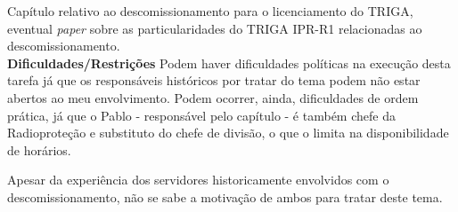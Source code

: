 Capítulo relativo ao descomissionamento para o licenciamento do TRIGA, eventual 
\textit{paper} sobre as particularidades do TRIGA IPR-R1 relacionadas ao descomissionamento.\\

\textbf{Dificuldades/Restrições}
Podem haver dificuldades políticas na execução desta tarefa já que os responsáveis 
históricos por tratar do tema podem não estar abertos ao meu envolvimento. Podem ocorrer, ainda, dificuldades de ordem prática, já que o Pablo - responsável pelo capítulo - é também chefe da Radioproteção e substituto do chefe de divisão, o que 
o limita na disponibilidade de horários.

Apesar da experiência dos servidores historicamente envolvidos com o descomissionamento, não se sabe a motivação de ambos para tratar deste tema.


